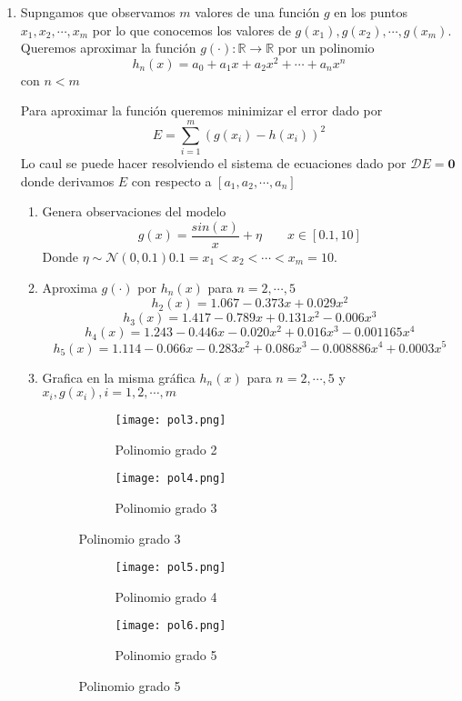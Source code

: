 \documentclass{article}
\begin{document}
\begin{enumerate}
\vspace{5px}
\item Supngamos que observamos $m$ valores de una función $g$ en los puntos $x_1, x_2, \cdots , x_m$ por lo que conocemos los valores de $g(x_1), g(x_2), \cdots , g(x_m)$. Queremos aproximar la función $g(\cdot) : \mathbb{R} \rightarrow \mathbb{R}$ por un polinomio
$$h_n(x) = a_0 + a_1x + a_2x^2 + \cdots + a_nx^n$$
con $n < m$

Para aproximar la función queremos minimizar el error dado por 
$$E = \sum_{i=1}^{m}{(g(x_i) - h(x_i))^2}$$
Lo caul se puede hacer resolviendo el sistema de ecuaciones dado por $\mathcal{D}E = \boldsymbol{0}$ donde derivamos $E$ con respecto a $[a_1, a_2, \cdots, a_n]$



\begin{enumerate}
  \item Genera observaciones del modelo
  $$g(x) = \frac{sin(x)}{x} + \eta \qquad x \in [0.1, 10]$$
  Donde $\eta \sim \mathcal{N}(0, 0.1) 0.1=x_1 <x_2 <\cdots<x_m =10.$
  \item Aproxima $g(\cdot)$ por $h_n(x)$ para $n = 2, \cdots, 5$
  $$h_2(x) = 1.067 - 0.373x + 0.029x^2$$
  $$h_3(x) = 1.417 - 0.789x + 0.131x^2 - 0.006x^3$$
  $$h_4(x) = 1.243 - 0.446x - 0.020x^2 + 0.016x^3 - 0.001165x^4$$
  $$h_5(x) = 1.114 - 0.066x - 0.283x^2 + 0.086x^3 - 0.008886x^4 + 0.0003x^5$$
  \pagebreak
  \item Grafica en la misma gráfica $h_n(x)$ para $n = 2, \cdots, 5$ y ${x_i, g(x_i)}, i = 1, 2, \cdots, m$
  \begin{figure}[h]
  \centering
  \begin{subfigure}{.5\textwidth}
    \centering
    \texttt{[image: pol3.png]}
    \caption{Polinomio grado 2}
    \label{fig:sub1}
  \end{subfigure}%
  \begin{subfigure}{.5\textwidth}
    \centering
    \texttt{[image: pol4.png]}
    \caption{Polinomio grado 3}
    \label{fig:sub2}
  \end{subfigure}
  \end{figure}
  \begin{figure}[h]
  \centering
  \begin{subfigure}{.5\textwidth}
    \centering
    \texttt{[image: pol5.png]}
    \caption{Polinomio grado 4}
    \label{fig:sub3}
  \end{subfigure}%
  \begin{subfigure}{.5\textwidth}
    \centering
    \texttt{[image: pol6.png]}
    \caption{Polinomio grado 5}
    \label{fig:sub4}
  \end{subfigure}
  \end{figure}
\end{enumerate}


\end{enumerate}
\end{document}
